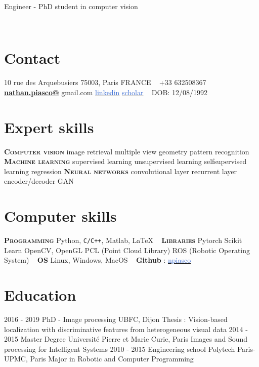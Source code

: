 \documentclass[]{friggeri-cv-cust}
\begin{document}
      {Engineer - PhD student in computer vision}
      
\vspace{10pt}
\vspace{1pt}

\begin{aside}
  ~
  \section{Contact}
    10 rue des Arquebusiers
    75003, Paris
    FRANCE
    ~
    +33 632508367
    ~
   	\href{mailto:nathan.piasco@gmail.com}{\textbf{nathan.piasco@}}
   	gmail.com
	{\href{https://www.linkedin.com/in/nathan-piasco-a4766aa5/}{\textcolor{highlight}{linkedin}}}
	{\href{https://scholar.google.fr/citations?user=S3zYmOYAAAAJ&hl=fr}{\textcolor{highlight}{scholar}}}
	~
    DOB: 12/08/1992
  \section{Expert skills}
    \textbf{\small{\textsc{Computer vision}}}
    image retrieval
    multiple view geometry
    pattern recognition
    \textbf{\small{\textsc{Machine learning}}}
    supervised learning
    unsupervised learning
    selfsupervised learning
    regression
    \textbf{\small{\textsc{Neural networks}}}
    convolutional layer
    recurrent layer
    encoder/decoder
    GAN
  \section{Computer skills}
    \textbf{\textsc{\textsc{Programming}}}
    Python, \texttt{C/C++},
    Matlab,  \LaTeX
    ~
    \textbf{\textsc{Libraries}}
    Pytorch
    Scikit Learn
	OpenCV, OpenGL
    PCL (Point Cloud Library)
    ROS (Robotic Operating System)
    ~
    \textbf{\textsc{OS}}
    Linux, Windows, MacOS
    ~
    \textbf{{Github}} : {\href{https://github.com/npiasco}{\textcolor{highlight}{npiasco}}}
\end{aside}

\section{Education}
\begin{entrylist}
  \entry
    {2016 - 2019}
    {PhD - Image processing}
    {UBFC, Dijon}
    {Thesis : Vision-based localization with discriminative features from heterogeneous visual data}
  \entry
    {2014 - 2015}
    {Master Degree}
    {Universit\'e Pierre et Marie Curie, Paris}
    {Images and Sound processing for Intelligent Systems}
  \entry
    {2010 - 2015}
    {Engineering school}
    {Polytech Paris-UPMC, Paris}
    {Major in Robotic and Computer Programming}
\end{entrylist}
\end{document}
